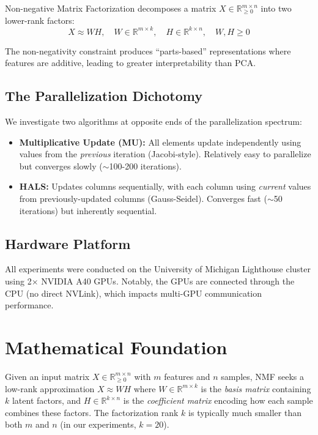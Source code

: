 \documentclass[11pt]{article}
\begin{document}
Non-negative Matrix Factorization decomposes a matrix $X \in \mathbb{R}^{m \times n}_{\ge 0}$ into two lower-rank factors:
\begin{equation}
    X \approx WH, \quad W \in \mathbb{R}^{m \times k}, \quad H \in \mathbb{R}^{k \times n}, \quad W, H \ge 0
\end{equation}

The non-negativity constraint produces ``parts-based'' representations where features are additive, leading to greater interpretability than PCA.

\subsection{The Parallelization Dichotomy}

We investigate two algorithms at opposite ends of the parallelization spectrum:

\begin{itemize}
    \item \textbf{Multiplicative Update (MU):} All elements update independently using values from the \textit{previous} iteration (Jacobi-style). Relatively easy to parallelize but converges slowly ($\sim$100-200 iterations).

    \item \textbf{HALS:} Updates columns sequentially, with each column using \textit{current} values from previously-updated columns (Gauss-Seidel). Converges fast ($\sim$50 iterations) but inherently sequential.
\end{itemize}

\subsection{Hardware Platform}

All experiments were conducted on the University of Michigan Lighthouse cluster using 2$\times$ NVIDIA A40 GPUs. Notably, the GPUs are connected through the CPU (no direct NVLink), which impacts multi-GPU communication performance.

\section{Mathematical Foundation}

Given an input matrix $X \in \mathbb{R}^{m \times n}_{\ge 0}$ with $m$ features and $n$ samples, NMF seeks a low-rank approximation $X \approx WH$ where $W \in \mathbb{R}^{m \times k}$ is the \textit{basis matrix} containing $k$ latent factors, and $H \in \mathbb{R}^{k \times n}$ is the \textit{coefficient matrix} encoding how each sample combines these factors. The factorization rank $k$ is typically much smaller than both $m$ and $n$ (in our experiments, $k = 20$).
\end{document}
